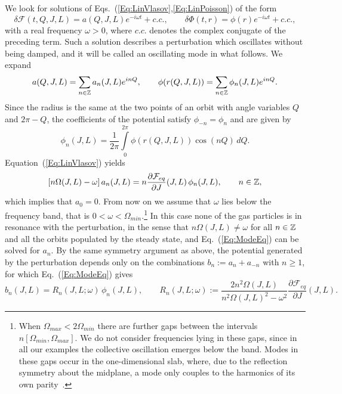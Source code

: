 We look for solutions of Eqs.~(\ref{Eq:LinVlasov},\ref{Eq:LinPoisson}) of the form
\begin{equation}
\delta\mathcal{F}(t,Q,J,L) = a(Q,J,L) e^{-i\omega t} + c.c.,\qquad
\delta\Phi(t,r) = \phi(r) e^{-i\omega t} + c.c.,
\label{Eq:ModeAnsatz}
\end{equation}
with a real frequency $\omega > 0$, where $c.c.$ denotes the complex conjugate of the preceding term. Such a solution describes a perturbation which oscillates without being damped, and it will be called an oscillating mode in what follows. We expand
\begin{equation}
a(Q,J,L) = \sum\limits_{n\in\mathbb{Z}} a_n(J,L) e^{inQ},\qquad
\phi(r(Q,J,L)) = \sum\limits_{n\in\mathbb{Z}} \phi_n(J,L) e^{inQ}.
\end{equation}
Since the radius is the same at the two points of an orbit with angle variables $Q$ and $2\pi - Q$, the coefficients of the potential satisfy $\phi_{-n} = \phi_n$ and are given by
\begin{equation}
\phi_n(J,L) = \frac{1}{2\pi}\int\limits_0^{2\pi} \phi(r(Q,J,L))\cos(nQ)\, dQ.
\label{Eq:phin}
\end{equation}
Equation~(\ref{Eq:LinVlasov}) yields
\begin{equation}
\left[ n\Omega(J,L) - \omega \right] a_n(J,L) = n\frac{\partial\mathcal{F}_{eq}}{\partial J}(J,L)\,\phi_n(J,L),\qquad n\in\mathbb{Z},
\label{Eq:ModeEq}
\end{equation}
which implies that $a_0 = 0$. From now on we assume that $\omega$ lies below the frequency band, that is $0 < \omega < \Omega_{min}$.\footnote{When $\Omega_{max} < 2\Omega_{min}$ there are further gaps between the intervals $n[\Omega_{min},\Omega_{max}]$. We do not consider frequencies lying in these gaps, since in all our examples the collective oscillation emerges below the band. Modes in these gaps occur in the one-dimensional slab, where, due to the reflection symmetry about the midplane, a mode only couples to the harmonics of its own parity~\cite{mW91,pL92}.} In this case none of the gas particles is in resonance with the perturbation, in the sense that $n\Omega(J,L)\neq \omega$ for all $n\in\mathbb{Z}$ and all the orbits populated by the steady state, and Eq.~(\ref{Eq:ModeEq}) can be solved for $a_n$. By the same symmetry argument as above, the potential generated by the perturbation depends only on the combinations $b_n := a_n + a_{-n}$ with $n\geq 1$, for which Eq.~(\ref{Eq:ModeEq}) gives
\begin{equation}
b_n(J,L) = R_n(J,L;\omega)\,\phi_n(J,L),\qquad
R_n(J,L;\omega) := \frac{2n^2\Omega(J,L)}{n^2\Omega(J,L)^2 - \omega^2}\frac{\partial\mathcal{F}_{eq}}{\partial J}(J,L).
\label{Eq:Rn}
\end{equation}
